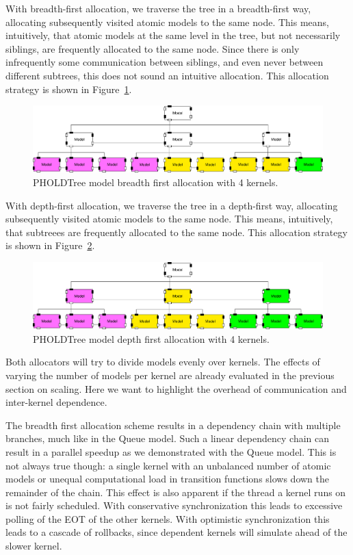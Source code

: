 With breadth-first allocation, we traverse the tree in a breadth-first way, allocating subsequently visited atomic models to the same node.
This means, intuitively, that atomic models at the same level in the tree, but not necessarily siblings, are frequently allocated to the same node.
Since there is only infrequently some communication between siblings, and even never between different subtrees, this does not sound an intuitive allocation.
This allocation strategy is shown in Figure~\ref{fig:PholdTree_model_bfs}.

\begin{figure}
   \center
   \includegraphics[width=\columnwidth]{fig/pholdtree_alloc_BF.pdf}
   \caption{PHOLDTree model breadth first allocation with 4 kernels.}
   \label{fig:PholdTree_model_bfs}
\end{figure}

With depth-first allocation, we traverse the tree in a depth-first way, allocating subsequently visited atomic models to the same node.
This means, intuitively, that subtreees are frequently allocated to the same node.
This allocation strategy is shown in Figure~\ref{fig:PholdTree_model_dfs}.

\begin{figure}
   \center
   \includegraphics[width=\columnwidth]{fig/pholdtree_alloc_DF.pdf}
   \caption{PHOLDTree model depth first allocation with 4 kernels.}
   \label{fig:PholdTree_model_dfs}
\end{figure}

Both allocators will try to divide models evenly over kernels.
The effects of varying the number of models per kernel are already evaluated in the previous section on scaling.
Here we want to highlight the overhead of communication and inter-kernel dependence. 

The breadth first allocation scheme results in a dependency chain with multiple branches, much like in the Queue model.
Such a linear dependency chain can result in a parallel speedup as we demonstrated with the Queue model.
This is not always true though: a single kernel with an unbalanced number of atomic models or unequal computational load in transition functions slows down the remainder of the chain.
This effect is also apparent if the thread a kernel runs on is not fairly scheduled.
With conservative synchronization this leads to excessive polling of the EOT of the other kernels.
With optimistic synchronization this leads to a cascade of rollbacks, since dependent kernels will simulate ahead of the slower kernel.

